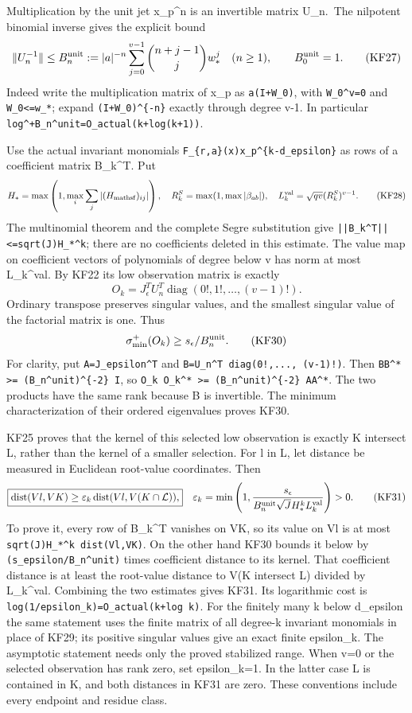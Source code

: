 \documentclass[11pt]{article}
\begin{document}
Multiplication by the unit jet x\_p\^{}n is an invertible matrix U\_n.~The nilpotent binomial inverse gives the explicit bound \[
\|U_n^{-1}\|\le B_n^{\rm unit}:=
|a|^{-n}\sum_{j=0}^{v-1}\binom{n+j-1}{j}w_*^j\quad(n\ge1),
\qquad B_0^{\rm unit}=1.
\tag{KF27}
\] Indeed write the multiplication matrix of x\_p as \texttt{a(I+W\_0)}, with \texttt{W\_0\^{}v=0} and \texttt{\textbar{}\textbar{}W\_0\textbar{}\textbar{}\textless{}=w\_*}; expand \texttt{(I+W\_0)\^{}\{-n\}} exactly through degree v-1. In particular \nolinkurl{log^+B_n^unit=O_actual(k+log(k+1))}.

Use the actual invariant monomials \nolinkurl{F_{r,a}(x)x_p^{k-d_epsilon}} as rows of a coefficient matrix B\_k\^{}T. Put \[
H_* =\max\left(1,\max_i\sum_j|(H_{\rm mathsf})_{ij}|\right),
\quad R_k^S=\max(1,\max|\beta_{ab}|),\quad
L_k^{\rm val}=\sqrt{qv}(R_k^S)^{v-1}.
\tag{KF28}
\] The multinomial theorem and the complete Segre substitution give \nolinkurl{||B_k^T||<=sqrt(J)H_*^k}; there are no coefficients deleted in this estimate. The value map on coefficient vectors of polynomials of degree below v has norm at most L\_k\^{}val. By KF22 its low observation matrix is exactly \[
O_k=J_\epsilon^T U_n^T\operatorname{diag}(0!,1!,\ldots,(v-1)!).
\tag{KF29}
\] Ordinary transpose preserves singular values, and the smallest singular value of the factorial matrix is one. Thus \[
\sigma_{\min}^+(O_k)\ge s_\epsilon/B_n^{\rm unit}.
\tag{KF30}
\] For clarity, put \texttt{A=J\_epsilon\^{}T} and \nolinkurl{B=U_n^T diag(0!,..., (v-1)!)}. Then \nolinkurl{BB^* >= (B_n^unit)^{-2} I}, so \nolinkurl{O_k O_k^* >= (B_n^unit)^{-2} AA^*}. The two products have the same rank because B is invertible. The minimum characterization of their ordered eigenvalues proves KF30.

KF25 proves that the kernel of this selected low observation is exactly K intersect L, rather than the kernel of a smaller selection. For l in L, let distance be measured in Euclidean root-value coordinates. Then \[
\boxed{\operatorname{dist}(Vl,VK)
\ge\varepsilon_k\operatorname{dist}(Vl,V(K\cap\mathcal L)),}
\quad
\varepsilon_k=
\min\left(1,\frac{s_\epsilon}
 {B_n^{\rm unit}\sqrt JH_*^k L_k^{\rm val}}\right)>0.
\tag{KF31}
\] To prove it, every row of B\_k\^{}T vanishes on VK, so its value on Vl is at most \nolinkurl{sqrt(J)H_*^k dist(Vl,VK)}. On the other hand KF30 bounds it below by \nolinkurl{(s_epsilon/B_n^unit)} times coefficient distance to its kernel. That coefficient distance is at least the root-value distance to V(K intersect L) divided by L\_k\^{}val. Combining the two estimates gives KF31. Its logarithmic cost is \nolinkurl{log(1/epsilon_k)=O_actual(k+log k)}. For the finitely many k below d\_epsilon the same statement uses the finite matrix of all degree-k invariant monomials in place of KF29; its positive singular values give an exact finite epsilon\_k. The asymptotic statement needs only the proved stabilized range. When v=0 or the selected observation has rank zero, set epsilon\_k=1. In the latter case L is contained in K, and both distances in KF31 are zero. These conventions include every endpoint and residue class.
\end{document}
